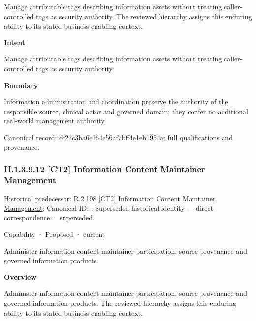 Manage attributable tags describing information assets without treating caller-controlled tags as security authority. The reviewed hierarchy assigns this enduring ability to its stated business-enabling context.



\textbf{Intent}



Manage attributable tags describing information assets without treating caller-controlled tags as security authority.



\textbf{Boundary}



Information administration and coordination preserve the authority of the responsible source, clinical actor and governed domain; they confer no additional real-world management authority.


{\footnotesize \href{../../../../../../../continuum/strategy/capability/df27c3ba6e164e56af7bff4e1eb1954a.md}{Canonical record: df27c3ba6e164e56af7bff4e1eb1954a}; full qualifications and provenance.}\par
\subsubsection*{II.1.3.9.12 [CT2] Information Content Maintainer Management}
\label{navigation:II.1.3.9.12}

{\small Historical predecessor: R.2.198 \hyperref[element:acb977e879204f1491293e5452e0ddf0]{[CT2] Information Content Maintainer Management}; Canonical ID: \texttt{}. Superseded historical identity — direct correspondence · superseded.}\par
\label{element:b81a1ab42af24c2e9896b8f3f78d291a}
{\small Capability · Proposed · current}\par

Administer information-content maintainer participation, source provenance and governed information products.



\textbf{Overview}



Administer information-content maintainer participation, source provenance and governed information products. The reviewed hierarchy assigns this enduring ability to its stated business-enabling context.



